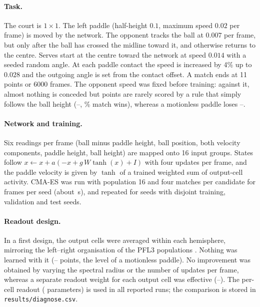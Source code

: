 \documentclass[11pt]{article}
\begin{document}
\paragraph{Task.}
The court is $1\times1$. The left paddle (half-height $0.1$, maximum speed $0.02$ per frame) is
moved by the network. The opponent tracks the ball at $0.007$ per frame, but only after the ball has
crossed the midline toward it, and otherwise returns to the centre. Serves start at the centre toward
the network at speed $0.014$ with a seeded random angle. At each paddle contact the speed is
increased by 4\% up to $0.028$ and the outgoing angle is set from the contact offset. A match ends at
11 points or 6000 frames. The opponent speed was fixed before training: against it, almost nothing is
conceded but points are rarely scored by a rule that simply follows the ball height
(\RuleFor{}--\RuleAgainst{}, \RuleWinPct\% match wins), whereas a motionless paddle loses
\StillFor{}--\StillAgainst{}.

\paragraph{Network and training.}
Six readings per frame (ball minus paddle height, ball position, both velocity components, paddle
height, ball height) are mapped onto 16 input groups. States follow
$x \leftarrow x + a(-x + g\,W\tanh(x) + I)$ with four updates per frame, and the paddle velocity is
given by $\tanh$ of a trained weighted sum of output-cell activity. CMA-ES \cite{hansen2001} was run
with population 16 and four matches per candidate for \BudgetFrames{} frames per seed (about
\TrainTimeMean{}\,s), and repeated for \NSeeds{} seeds with disjoint training, validation and test
seeds.

\paragraph{Readout design.}
In a first design, the output cells were averaged within each hemisphere, mirroring the left--right
organisation of the PFL3 populations \cite{westeinde2024}. Nothing was learned with it
(\DiagBaseFor{}--\DiagBaseAgainst{} points, the level of a motionless paddle). No improvement was
obtained by varying the spectral radius or the number of updates per frame, whereas a separate
readout weight for each output cell was effective (\DiagBestFor{}--\DiagBestAgainst{}). The per-cell
readout (\NParams{} parameters) is used in all reported runs; the comparison is stored in
\texttt{results/diagnose.csv}.
\end{document}
